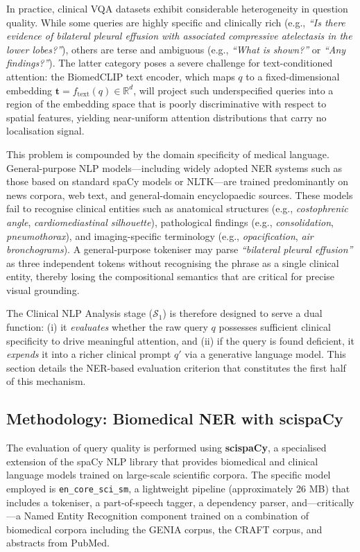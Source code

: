 In practice, clinical VQA datasets exhibit considerable heterogeneity in question quality. While some queries are highly specific and clinically rich (e.g., \textit{``Is there evidence of bilateral pleural effusion with associated compressive atelectasis in the lower lobes?''}), others are terse and ambiguous (e.g., \textit{``What is shown?''} or \textit{``Any findings?''}). The latter category poses a severe challenge for text-conditioned attention: the BiomedCLIP text encoder, which maps $q$ to a fixed-dimensional embedding $\mathbf{t} = f_{\text{text}}(q) \in \mathbb{R}^d$, will project such underspecified queries into a region of the embedding space that is poorly discriminative with respect to spatial features, yielding near-uniform attention distributions that carry no localisation signal.

This problem is compounded by the domain specificity of medical language. General-purpose NLP models—including widely adopted NER systems such as those based on standard spaCy models or NLTK—are trained predominantly on news corpora, web text, and general-domain encyclopaedic sources. These models fail to recognise clinical entities such as anatomical structures (e.g., \textit{costophrenic angle}, \textit{cardiomediastinal silhouette}), pathological findings (e.g., \textit{consolidation}, \textit{pneumothorax}), and imaging-specific terminology (e.g., \textit{opacification}, \textit{air bronchograms}). A general-purpose tokeniser may parse \textit{``bilateral pleural effusion''} as three independent tokens without recognising the phrase as a single clinical entity, thereby losing the compositional semantics that are critical for precise visual grounding.

The Clinical NLP Analysis stage ($\mathcal{S}_1$) is therefore designed to serve a dual function: (i) it \textit{evaluates} whether the raw query $q$ possesses sufficient clinical specificity to drive meaningful attention, and (ii) if the query is found deficient, it \textit{expends} it into a richer clinical prompt $q'$ via a generative language model. This section details the NER-based evaluation criterion that constitutes the first half of this mechanism.

\subsection{Methodology: Biomedical NER with scispaCy}
\label{sec:3_2_2}
The evaluation of query quality is performed using \textbf{scispaCy}, a specialised extension of the spaCy NLP library that provides biomedical and clinical language models trained on large-scale scientific corpora. The specific model employed is \texttt{en\_core\_sci\_sm}, a lightweight pipeline (approximately 26 MB) that includes a tokeniser, a part-of-speech tagger, a dependency parser, and—critically—a Named Entity Recognition component trained on a combination of biomedical corpora including the GENIA corpus, the CRAFT corpus, and abstracts from PubMed.

